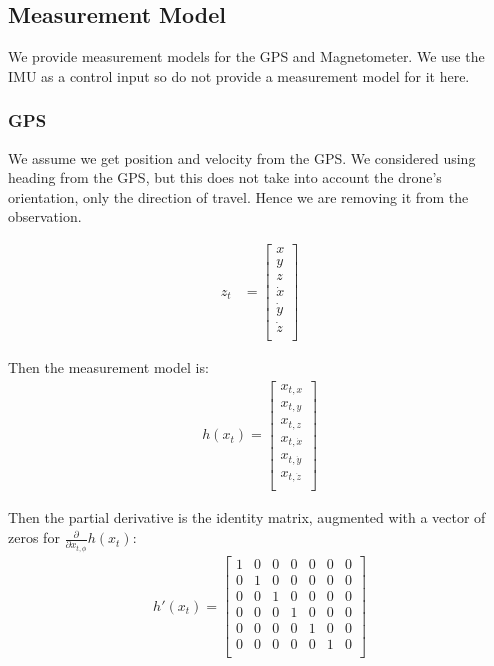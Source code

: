 \documentclass{article}
\begin{document}
\subsection{Measurement Model}

We provide measurement models for the GPS and Magnetometer. We use the IMU as a control input so do not provide a measurement model for it here.



\subsubsection{GPS}

We assume we get position and velocity from the GPS.  We considered
using heading from the GPS, but this does not take into account the
drone's orientation, only the direction of travel.  Hence we are
removing it from the observation.

\begin{align}
  z_t &= \left[ \begin{array}{c}
      x\\
      y\\
      z\\
      \dot{x}\\
      \dot{y}\\
      \dot{z}\\
      \end{array} \right]
\end{align}

Then the measurement model is: 
\begin{align}
  h(x_t) = \left[\begin{array}{c}
      x_{t,x}\\
      x_{t,y}\\
      x_{t,z}\\
      x_{t,\dot{x}}\\
      x_{t,\dot{y}}\\
      x_{t,\dot{z}}\\
    \end{array}\right]
\end{align}

Then the partial derivative is the identity matrix, augmented with a vector of zeros for $\frac{\partial}{\partial x_{t,\phi}} h(x_t)$: 
\begin{align}
  h'(x_t) = \left[\begin{array}{ccccccc}
      1&0&0&0&0&0&0\\
      0&1&0&0&0&0&0\\
      0&0&1&0&0&0&0\\
      0&0&0&1&0&0&0\\
      0&0&0&0&1&0&0\\
      0&0&0&0&0&1&0\\                  
      \end{array}\right]
\end{align}
\end{document}
